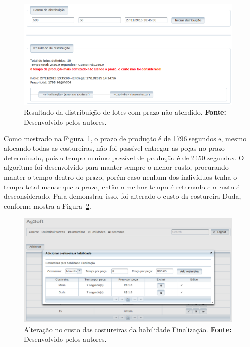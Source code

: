 \begin{figure}[h!]
	\centerline{\includegraphics[width=13cm]{./imagens/resultado1_teste6.png}}
	\caption[Resultado da distribuição de lotes com prazo não atendido.] 
	{Resultado da distribuição de lotes com prazo não atendido. \textbf{Fonte:} Desenvolvido pelos
	autores.}
	\label{fig:resultado1_teste6}
\end{figure}

\par Como mostrado na Figura~\ref{fig:resultado1_teste6}, o prazo de produção
é de 1796 segundos e, mesmo alocando todas as costureiras, não foi possível
entregar as peças no prazo determinado, pois o tempo mínimo possível de produção
é de 2450 segundos. O algoritmo foi desenvolvido para manter sempre o menor custo, procurando manter o tempo
dentro do prazo, porém caso nenhum dos indivíduos tenha o tempo total menor que o prazo,
então o melhor tempo é retornado e o custo é desconsiderado.
Para demonstrar isso, foi alterado o custo da costureira Duda, conforme mostra a
Figura~\ref{fig:alterecao_custotcseis}.
 

\begin{figure}[h!]
	\centerline{\includegraphics[width=14.7cm]{./imagens/alterecao_custo_teste6.png}}
	\caption[Alteração no custo das costureiras da habilidade Finalização.] 
	{Alteração no custo das costureiras da habilidade Finalização. \textbf{Fonte:} Desenvolvido pelos
		autores.}
	\label{fig:alterecao_custotcseis}
\end{figure}

